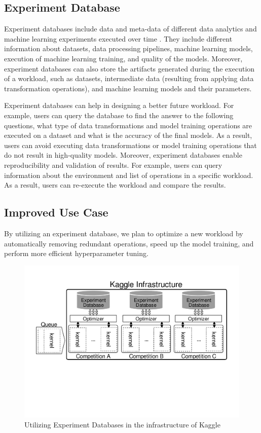 \subsection{Experiment Database}
Experiment databases include data and meta-data of different data analytics and machine learning experiments executed over time \cite{miao2018provdb, vanschoren2014openml, schelter2017automatically, vartak2016m}.
They include different information about datasets, data processing pipelines, machine learning models, execution of machine learning training, and quality of the models. 
Moreover, experiment databases can also store the artifacts generated during the execution of a workload, such as datasets, intermediate data (resulting from applying data transformation operations), and machine learning models and their parameters.
 
Experiment databases can help in designing a better future workload.
For example, users can query the database to find the answer to the following questions, what type of data transformations and model training operations are executed on a dataset and what is the accuracy of the final models.
As a result, users can avoid executing data transformations or model training operations that do not result in high-quality models.
Moreover, experiment databases enable reproducibility and validation of results.
For example, users can query information about the environment and list of operations in a specific workload.
As a result, users can re-execute the workload and compare the results.

\subsection{Improved Use Case}
By utilizing an experiment database, we plan to optimize a new workload by automatically removing redundant operations, speed up the model training, and perform more efficient hyperparameter tuning.

\begin{figure}
\centering
\includegraphics[width=\columnwidth]{../images/improved-use-case}
\caption{Utilizing Experiment Databases in the infrastructure of Kaggle}
\label{improved-use-case}
\end{figure}

